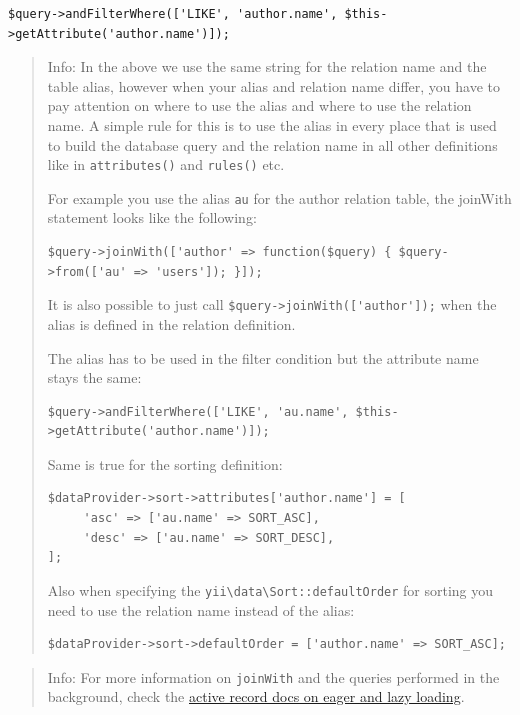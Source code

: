 \lstset{language=php}\begin{lstlisting}
$query->andFilterWhere(['LIKE', 'author.name', $this->getAttribute('author.name')]);
\end{lstlisting}
\begin{quote}Info: In the above we use the same string for the relation name and the table alias, however when your alias and relation name
differ, you have to pay attention on where to use the alias and where to use the relation name.
A simple rule for this is to use the alias in every place that is used to build the database query and the
relation name in all other definitions like in \lstinline|attributes()| and \lstinline|rules()| etc.

For example you use the alias \lstinline|au| for the author relation table, the joinWith statement looks like the following:

\lstset{language=php}\begin{lstlisting}
$query->joinWith(['author' => function($query) { $query->from(['au' => 'users']); }]);
\end{lstlisting}
It is also possible to just call \lstinline|$query->joinWith(['author']);| when the alias is defined in the relation definition.

The alias has to be used in the filter condition but the attribute name stays the same:

\lstset{language=php}\begin{lstlisting}
$query->andFilterWhere(['LIKE', 'au.name', $this->getAttribute('author.name')]);
\end{lstlisting}
Same is true for the sorting definition:

\lstset{language=php}\begin{lstlisting}
$dataProvider->sort->attributes['author.name'] = [
     'asc' => ['au.name' => SORT_ASC],
     'desc' => ['au.name' => SORT_DESC],
];
\end{lstlisting}
Also when specifying the \texttt{yii{\allowbreak{}\textbackslash}data{\allowbreak{}\textbackslash}Sort\allowbreak{}::\allowbreak{}defaultOrder} for sorting you need to use the relation name
instead of the alias:

\lstset{language=php}\begin{lstlisting}
$dataProvider->sort->defaultOrder = ['author.name' => SORT_ASC];
\end{lstlisting}
\end{quote}
\begin{quote}Info: For more information on \lstinline|joinWith| and the queries performed in the background, check the
\hyperref[active-record.md::lazy-and-eager-loading]{active record docs on eager and lazy loading}.

\end{quote}
